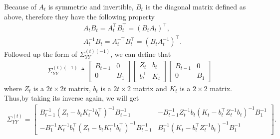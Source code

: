 Because of $A_t$ is symmetric and invertible, $B_t$ is the diagonal matrix defined as above, therefore they have the following property 
\begin{align}
& A_tB_t=A_t^\top B_t^\top = \left(B_tA_t\right)^\top, \\
& A_t^{-1}B_t = A_t^{-\top}B_t^\top = \left(B_tA_t^{-1}\right)^\top. 
\end{align}
Followed up the form of $\Sigma_{YY}^{(t) (-1)}$, we can define that 
\begin{align}
\Sigma_{YY}^{(t) (-1)} \triangleq \begin{bmatrix} 
B_{t-1} & 0 \\ 0 & B_1 \end{bmatrix}
\begin{bmatrix} 
Z_{t} & b_{t} \\
b_{t}^\top & K_{t}
\end{bmatrix} \begin{bmatrix} 
B_{t-1} & 0 \\ 0 & B_1\end{bmatrix}
\end{align}
where $Z_{t}$ is a $2t \times 2t$ matrix, $ b_{t} $ is a $2t \times 2$ matrix and $K_{t}$ is a $2 \times 2$ matrix. Thus,by taking its inverse again, we will get 
\begin{align} 
\Sigma_{YY}^{\left(t\right)}= \begin{bmatrix}
B_{t-1}^{-1} \left(Z_{t}-b_{t}K_{t}^{-1}b_{t}^\top\right)^{-1}B_{t-1}^{-1}  & - B_{t-1}^{-1}  Z_{t}^{-1}b_{t}\left(K_{t}-b_{t}^\top Z_{t}^{-1}b_{t}\right)^{-1}B_1^{-1} \\
-B_1^{-1}  K_{t}^{-1}b_{t}^\top \left(Z_{t}-b_{t}K_{t}^{-1}b_{t}^\top\right)^{-1}B_{t-1}^{-1}  & B_1^{-1}  \left(K_{t}-b_{t}^\top Z_{t}^{-1}b_{t}\right)^{-1}B_1^{-1} 
\end{bmatrix}.
\end{align}

